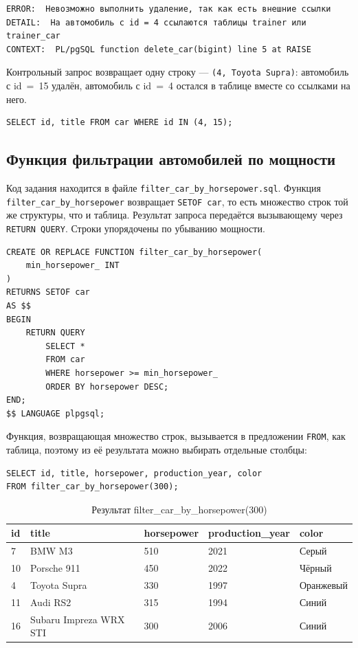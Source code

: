 \documentclass[oneside,a4paper,14pt]{extarticle}
\begin{document}
\begin{Verbatim}[fontsize=\footnotesize,breaklines=true]
ERROR:  Невозможно выполнить удаление, так как есть внешние ссылки
DETAIL:  На автомобиль с id = 4 ссылаются таблицы trainer или trainer_car
CONTEXT:  PL/pgSQL function delete_car(bigint) line 5 at RAISE
\end{Verbatim}

Контрольный запрос возвращает одну строку --- \texttt{(4, Toyota Supra)}: автомобиль с id~=~15 удалён, автомобиль с id~=~4 остался в таблице вместе со ссылками на него.

\begin{verbatim}
SELECT id, title FROM car WHERE id IN (4, 15);
\end{verbatim}

\subsection{Функция фильтрации автомобилей по мощности}

Код задания находится в файле \texttt{filter\_car\_by\_horsepower.sql}. Функция \texttt{filter\_car\_by\_horsepower} возвращает \texttt{SETOF car}, то есть множество строк той же структуры, что и таблица. Результат запроса передаётся вызывающему через \texttt{RETURN QUERY}. Строки упорядочены по убыванию мощности.

\begin{verbatim}
CREATE OR REPLACE FUNCTION filter_car_by_horsepower(
    min_horsepower_ INT
)
RETURNS SETOF car
AS $$
BEGIN
    RETURN QUERY
        SELECT *
        FROM car
        WHERE horsepower >= min_horsepower_
        ORDER BY horsepower DESC;
END;
$$ LANGUAGE plpgsql;
\end{verbatim}

Функция, возвращающая множество строк, вызывается в предложении \texttt{FROM}, как таблица, поэтому из её результата можно выбирать отдельные столбцы:

\begin{verbatim}
SELECT id, title, horsepower, production_year, color
FROM filter_car_by_horsepower(300);
\end{verbatim}

\begin{table}[H]
\centering
\footnotesize
\caption{Результат filter\_car\_by\_horsepower(300)}\label{tab:filter}
\begin{tabular}{|l|l|l|l|l|}
\hline
\textbf{id} & \textbf{title} & \textbf{horsepower} & \textbf{production\_\allowbreak year} & \textbf{color} \\ \hline
7 & BMW M3 & 510 & 2021 & Серый \\ \hline
10 & Porsche 911 & 450 & 2022 & Чёрный \\ \hline
4 & Toyota Supra & 330 & 1997 & Оранжевый \\ \hline
11 & Audi RS2 & 315 & 1994 & Синий \\ \hline
16 & Subaru Impreza WRX STI & 300 & 2006 & Синий \\ \hline
\end{tabular}
\end{table}
\end{document}
